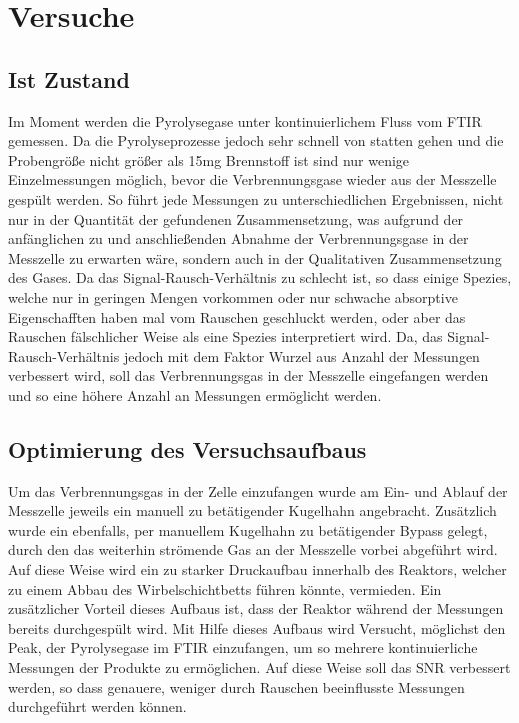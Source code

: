 \chapter{Versuche}

\section{Ist Zustand}

Im Moment werden die Pyrolysegase unter kontinuierlichem Fluss vom FTIR gemessen. Da die Pyrolyseprozesse jedoch sehr schnell von statten gehen und die Probengröße nicht größer als 15mg Brennstoff ist sind nur wenige Einzelmessungen möglich, bevor die Verbrennungsgase wieder aus der Messzelle gespült werden. So führt jede Messungen zu unterschiedlichen Ergebnissen, nicht nur in der Quantität der gefundenen Zusammensetzung, was aufgrund der anfänglichen zu und anschließenden Abnahme  der Verbrennungsgase in der Messzelle zu erwarten wäre, sondern auch in der Qualitativen Zusammensetzung des Gases. Da das Signal-Rausch-Verhältnis  zu schlecht ist, so dass einige Spezies, welche nur in geringen Mengen vorkommen oder nur schwache absorptive Eigenschafften haben mal vom Rauschen geschluckt werden, oder aber das Rauschen fälschlicher Weise als eine Spezies interpretiert wird. Da, das Signal-Rausch-Verhältnis jedoch mit dem Faktor Wurzel aus Anzahl der Messungen verbessert wird, soll das Verbrennungsgas in der Messzelle eingefangen werden und so eine höhere Anzahl an Messungen ermöglicht werden.


\section{Optimierung des Versuchsaufbaus}

Um das Verbrennungsgas in der Zelle einzufangen wurde am Ein- und Ablauf der Messzelle jeweils ein manuell zu betätigender Kugelhahn angebracht. Zusätzlich wurde ein ebenfalls, per manuellem Kugelhahn zu betätigender Bypass gelegt, durch den das weiterhin strömende Gas an der Messzelle vorbei abgeführt wird. Auf diese Weise wird ein zu starker Druckaufbau innerhalb des Reaktors, welcher zu einem Abbau des Wirbelschichtbetts führen könnte, vermieden. Ein zusätzlicher Vorteil dieses Aufbaus ist, dass der Reaktor während der Messungen bereits durchgespült wird. Mit Hilfe dieses Aufbaus wird Versucht, möglichst den Peak, der Pyrolysegase im FTIR einzufangen, um so mehrere kontinuierliche Messungen der Produkte zu ermöglichen. Auf diese Weise soll das SNR verbessert werden, so dass genauere, weniger durch Rauschen beeinflusste Messungen durchgeführt werden können. \\
\\